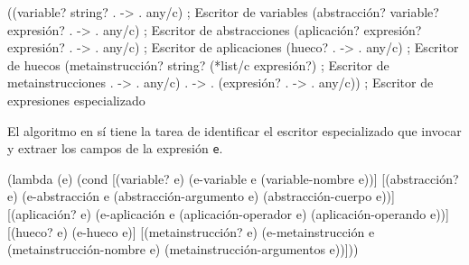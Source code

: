 \documentclass[10pt,oneside,openany,letterpaper]{book}
\begin{document}
\nwenddocs{}\endmoddef
((variable? string? . -> . any/c)                 ; Escritor de variables
 (abstracción? variable? expresión? . -> . any/c) ; Escritor de abstracciones
 (aplicación? expresión? expresión? . -> . any/c) ; Escritor de aplicaciones
 (hueco? . -> . any/c)                            ; Escritor de huecos
 (metainstrucción? string? (*list/c expresión?)   ; Escritor de metainstrucciones
                   . -> . any/c)
 . -> . (expresión? . -> . any/c))      ; Escritor de expresiones especializado
\nwendcode{}\nwdocspar

El algoritmo en sí tiene la tarea de identificar el escritor especializado que invocar y extraer los campos de la expresión {\tt{}e}.

\nwenddocs{}\endmoddef
(lambda (e)
  (cond [(variable? e)
         (e-variable e (variable-nombre e))]
        [(abstracción? e)
         (e-abstracción e (abstracción-argumento e) (abstracción-cuerpo e))]
        [(aplicación? e)
         (e-aplicación e (aplicación-operador e) (aplicación-operando e))]
        [(hueco? e)
         (e-hueco e)]
        [(metainstrucción? e)
         (e-metainstrucción e (metainstrucción-nombre e)
                            (metainstrucción-argumentos e))]))
\nwendcode{}\nwdocspar
\end{document}
